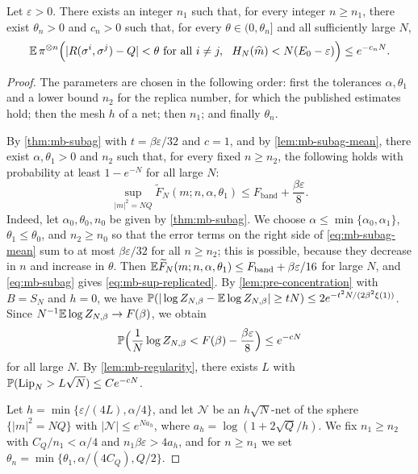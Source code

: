 \begin{lemma}\label{lem:mb-replica}
Let $\varepsilon>0$. There exists an integer $n_1$ such that, for every integer $n\ge n_1$, there exist $\theta_n>0$ and $c_n>0$ such that, for every $\theta\in(0,\theta_n]$ and all sufficiently large $N$,
\begin{equation}\label{eq:mb-replica}
\mathbb E\,\pi^{\otimes n}\Bigl(|R(\sigma^i,\sigma^j)-Q|<\theta\ \text{for all }i\neq j,\ \ H_N(\widehat m)<N(E_0-\varepsilon)\Bigr)\le e^{-c_nN}.
\end{equation}
\end{lemma}

\begin{proof}
The parameters are chosen in the following order: first the tolerances $\alpha,\theta_1$ and a lower bound $n_2$ for the replica number, for which the published estimates hold; then the mesh $h$ of a net; then $n_1$; and finally $\theta_n$.

By \cref{thm:mb-subag} with $t=\beta\varepsilon/32$ and $c=1$, and by \cref{lem:mb-subag-mean}, there exist $\alpha,\theta_1>0$ and $n_2$ such that, for every fixed $n\ge n_2$, the following holds with probability at least $1-e^{-N}$ for all large $N$:
\begin{equation}\label{eq:mb-sup-replicated}
\sup_{|m|^2=NQ}\widetilde F_N(m;n,\alpha,\theta_1)\le F_{\mathrm{band}}+\frac{\beta\varepsilon}8 .
\end{equation}
Indeed, let $\alpha_0,\theta_0,n_0$ be given by \cref{thm:mb-subag}. We choose $\alpha\le\min\{\alpha_0,\alpha_1\}$, $\theta_1\le\theta_0$, and $n_2\ge n_0$ so that the error terms on the right side of \eqref{eq:mb-subag-mean} sum to at most $\beta\varepsilon/32$ for all $n\ge n_2$; this is possible, because they decrease in $n$ and increase in $\theta$. Then $\mathbb E\widetilde F_N(m;n,\alpha,\theta_1)\le F_{\mathrm{band}}+\beta\varepsilon/16$ for large $N$, and \eqref{eq:mb-subag} gives \eqref{eq:mb-sup-replicated}. By \cref{lem:pre-concentration} with $B=S_N$ and $h=0$, we have $\mathbb P(|\log Z_{N,\beta}-\mathbb E\log Z_{N,\beta}|\ge tN)\le2e^{-t^2N/(2\beta^2\xi(1))}$. Since $N^{-1}\mathbb E\log Z_{N,\beta}\to F(\beta)$, we obtain
\begin{equation}\label{eq:mb-free-energy}
\mathbb P\Bigl(\frac1N\log Z_{N,\beta}<F(\beta)-\frac{\beta\varepsilon}8\Bigr)\le e^{-cN}
\end{equation}
for all large $N$. By \cref{lem:mb-regularity}, there exists $L$ with $\mathbb P(\mathrm{Lip}_N>L\sqrt N)\le Ce^{-cN}$.

Let $h=\min\{\varepsilon/(4L),\alpha/4\}$, and let $\mathcal N$ be an $h\sqrt N$-net of the sphere $\{|m|^2=NQ\}$ with $|\mathcal N|\le e^{Na_h}$, where $a_h=\log(1+2\sqrt Q/h)$. We fix $n_1\ge n_2$ with $C_Q/n_1<\alpha/4$ and $n_1\beta\varepsilon>4a_h$, and for $n\ge n_1$ we set $\theta_n=\min\{\theta_1,\alpha/(4C_Q),Q/2\}$.


\end{proof}
